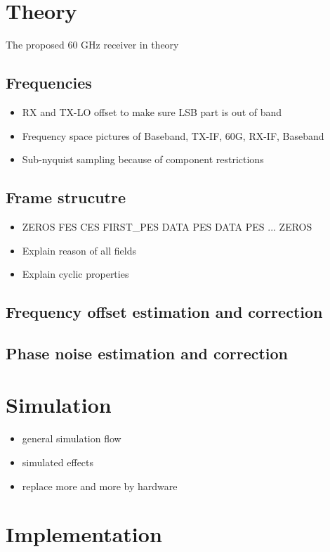 \chapter{Theory}
The proposed 60 GHz receiver in theory

\section{Frequencies}
\begin{itemize}
\item RX and TX-LO offset to make sure LSB part is out of band
\item Frequency space pictures of Baseband, TX-IF, 60G, RX-IF, Baseband
\item Sub-nyquist sampling because of component restrictions
\end{itemize}

\section{Frame strucutre}
\begin{itemize}
\item ZEROS FES CES FIRST\_PES DATA PES DATA PES ... ZEROS
\item Explain reason of all fields
\item Explain cyclic properties
\end{itemize}

\section{Frequency offset estimation and correction}
\section{Phase noise estimation and correction}

\chapter{Simulation}
\begin{itemize}
\item general simulation flow
\item simulated effects
\item replace more and more by hardware
\end{itemize}

\chapter{Implementation}
